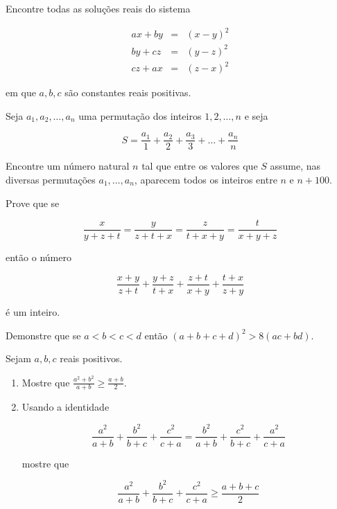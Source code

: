 \begin{questao}
  Encontre todas as soluções reais do sistema

  \begin{eqnarray*}
    ax+by & = & (x-y)^2 \\ by+cz & = & (y-z)^2 \\ cz+ax & = & (z-x)^2
  \end{eqnarray*}

  em que $a,b,c$ são constantes reais positivas.
\end{questao}

\begin{questao}
  Seja $a_1,a_2,\ldots,a_n$ uma permutação dos inteiros $1,2,\ldots,n$ e seja

  $$ S = \frac{a_1}{1} + \frac{a_2}{2} + \frac{a_3}{3} + \ldots +
  \frac{a_n}{n} $$

  Encontre um número natural $n$ tal que entre os valores que $S$ assume, nas
  diversas permutações $a_1,\ldots,a_n$, aparecem todos os inteiros entre $n$ e
  $n+100$.
\end{questao}

\begin{questao}
  Prove que se

  $$ \frac{x}{y+z+t} = \frac{y}{z+t+x} = \frac{z}{t+x+y} = \frac{t}{x+y+z} $$

  então o número

  $$ \frac{x+y}{z+t} + \frac{y+z}{t+x} + \frac{z+t}{x+y} + \frac{t+x}{z+y} $$

  é um inteiro.
\end{questao}

\begin{questao}
  Demonstre que se $a<b<c<d$ então $(a+b+c+d)^2 > 8(ac+bd)$.
\end{questao}

\begin{questao}
  Sejam $a,b,c$ reais positivos.

  \begin{enumerate}
    
  \item Mostre que $\frac{a^2+b^2}{a+b} \geq \frac{a+b}{2}$.
    
  \item Usando a identidade

    $$ \frac{a^2}{a+b} + \frac{b^2}{b+c} + \frac{c^2}{c+a} = \frac{b^2}{a+b} +
    \frac{c^2}{b+c} + \frac{a^2}{c+a} $$

    mostre que
    
    $$ \frac{a^2}{a+b} + \frac{b^2}{b+c} + \frac{c^2}{c+a} \geq \frac
    {a+b+c}{2} $$
  \end{enumerate}

\end{questao}

